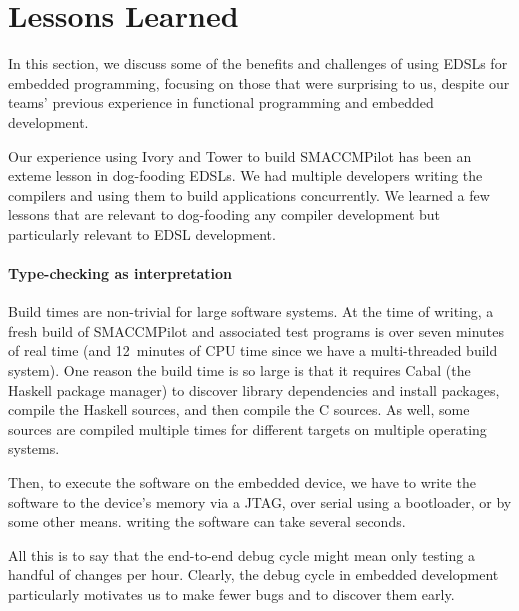 \section{Lessons Learned}
\label{sec:thegood}

In this section, we discuss some of the benefits and challenges of
using EDSLs for embedded programming, focusing on those that were surprising to
us, despite our teams' previous experience in functional programming and
embedded development.

Our experience using Ivory and Tower to build SMACCMPilot has been an exteme
lesson in dog-fooding EDSLs.  We had multiple developers writing the compilers
and using them to build applications concurrently.  We learned a few lessons
that are relevant to dog-fooding any compiler development but particularly
relevant to EDSL development.

\paragraph{Type-checking as interpretation}
Build times are non-trivial for large software systems.  At the time of writing,
a fresh build of SMACCMPilot and associated test programs is over seven minutes
of real time (and 12~minutes of CPU time since we have a multi-threaded build
system).  One reason the build time is so large is that it requires Cabal (the
Haskell package manager) to discover library dependencies and install packages,
compile the Haskell sources, and then compile the C sources.  As well, some
sources are compiled multiple times for different targets on
multiple operating systems.

Then, to execute the software on the embedded device, we have to write the
software to the device's memory via a JTAG, over serial using a bootloader, or
by some other means.  writing the software can take several seconds.

All this is to say that the end-to-end debug cycle might mean only testing a
handful of changes per hour.  Clearly, the debug cycle in embedded development
particularly motivates us to make fewer bugs and to discover them early.



